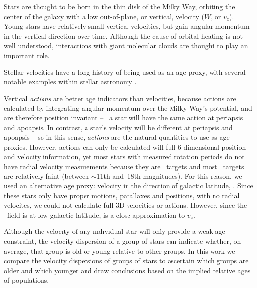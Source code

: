 Stars are thought to be born in the thin disk of the Milky Way, orbiting the
center of the galaxy with a low out-of-plane, or vertical, velocity ($W$, or
$v_z$).
Young stars have relatively small vertical velocities, but gain angular
momentum in the vertical direction over time.
Although the cause of orbital heating is not well understood, interactions
with giant molecular clouds are thought to play an important role.

Stellar velocities have a long history of being used as an age proxy, with
several notable examples within stellar astronomy \citep[\eg][]{faherty2009,
west2011}.

Vertical {\it actions} are better age indicators than velocities, because
actions are calculated by integrating angular momentum over the Milky Way's
potential, and are therefore position invariant -- \eg\ a star will have the
same action at periapsis and apoapsis.
In contrast, a star's velocity will be different at periapsis and apoapsis --
so in this sense, {\it actions} are the natural quantities to use as age
proxies.
However, actions can only be calculated will full 6-dimensional position and
velocity information, yet most stars with measured rotation periods do not
have radial velocity measurements because they are \kepler\ targets and most
\kepler\ targets are relatively faint (between $\sim$11th and $~$18th
magnitudes).
For this reason, we used an alternative age proxy: velocity in the direction
of galactic latitude, \vb.
Since these stars only have proper motions, parallaxes and positions, with no
radial velocites, we could not calculate full 3D velocities or actions.
However, since the \kepler\ field is at low galactic latitude, \vb is a close
approximation to $v_z$.

Although the velocity of any individual star will only provide a weak age
constraint, the velocity dispersion of a group of stars can indicate whether,
on average, that group is old or young relative to other groups.
In this work we compare the velocity dispersions of groups of stars to
ascertain which groups are older and which younger and draw conclusions based
on the implied relative ages of populations.
